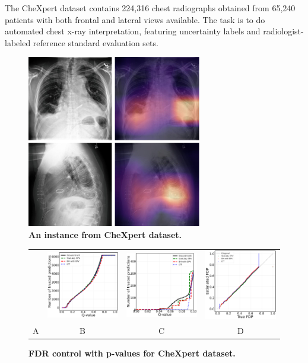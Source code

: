 \documentclass{article}
\begin{document}
The CheXpert dataset contains 224,316 chest radiographs obtained from 65,240 patients with both frontal and lateral views available. The task is to do automated chest x-ray interpretation, featuring uncertainty labels and radiologist-labeled reference standard evaluation sets.
\begin{figure}
	\advance\leftskip-0.5cm
	\includegraphics[width=3in]{img/chexpert.jpg}
	\caption{{\bf An instance from CheXpert dataset.}}
	\label{fig:chexpert_example}
\end{figure} 


\begin{figure}
	\centering
	\begin{tabular}{cccc}
 		&
		\includegraphics[width=1.7in]{img/cnn_chx_fdr_control.png} & 
            \includegraphics[width=1.7in]{img/cnn_chx_fdr_control_loc.png} & 
            \includegraphics[width=1.7in]{img/cnn_FDPscat_chx.png}
		\\	
		A & B & C & D
	\end{tabular}
	\caption{\bf FDR control with p-values for CheXpert dataset.}
	\label{fig:chexpert}
\end{figure}
\end{document}
